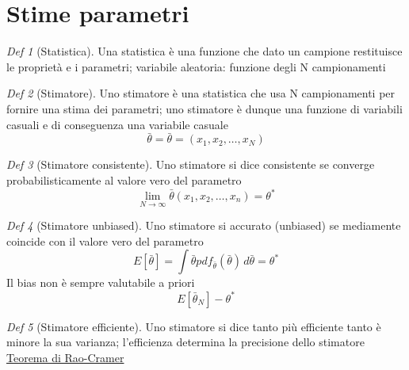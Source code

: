 \documentclass[12pt]{report}
\theoremstyle{remark}
\theoremstyle{theorem}
\newtheorem*{Def}{Def}
\begin{document}
\section{Stime parametri}
\begin{Def}[Statistica]
	Una statistica è una funzione che dato un campione restituisce le proprietà e i parametri; variabile aleatoria: funzione degli N campionamenti
\end{Def}
\begin{Def}[Stimatore]
	Uno stimatore è una statistica che usa N campionamenti per fornire una stima dei parametri; uno stimatore è dunque una funzione di variabili casuali e di conseguenza una variabile casuale 
	\[\bar{\theta} = \bar{\theta} = (x_1,x_2,\dots ,x_N)\]
\end{Def}
\begin{Def}[Stimatore consistente]
	Uno stimatore si dice consistente se converge probabilisticamente al valore vero del parametro
	\[\lim_{N\to\infty} \bar{\theta}(x_1,x_2,\dots , x_n) = \theta^*\]
\end{Def}
\begin{Def}[Stimatore unbiased]
	Uno stimatore si accurato (unbiased) se mediamente coincide con il valore vero del parametro
	\[E[\bar{\theta}] = \int \bar{\theta} pdf_{\bar{\theta}}(\bar{\theta}) \, d\bar{\theta} = \theta^*\]
	Il bias non è sempre valutabile a priori
	\[E[\bar{\theta}_N] - \theta^*\]
\end{Def}
\begin{Def}[Stimatore efficiente]
	Uno stimatore si dice tanto più efficiente tanto è minore la sua varianza; l'efficienza determina la precisione dello stimatore \newline
	\hyperref[teo:Rao]{Teorema di Rao-Cramer}
\end{Def}
\end{document}

